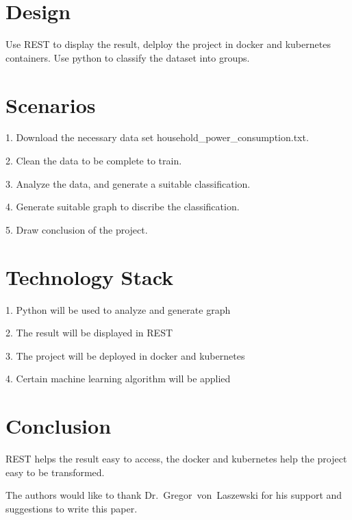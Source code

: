 \section{Design}

Use REST to display the result, delploy the project in docker and kubernetes containers.
Use python to classify the dataset into groups.

\section{Scenarios}

1. Download the necessary data set household\_power\_consumption.txt\cite{editor00}.

2. Clean the data to be complete to train.

3. Analyze the data, and generate a suitable classification.

4. Generate suitable graph to discribe the classification.

5. Draw conclusion of the project.


\section{Technology Stack}

1. Python will be used to analyze and generate graph

2. The result will be displayed in REST

3. The project will be deployed in docker and kubernetes

4. Certain machine learning algorithm will be applied


\section{Conclusion}

REST helps the result easy to access, the docker and kubernetes help the project easy to be transformed.


\begin{acks}

  The authors would like to thank Dr.~Gregor~von~Laszewski for his
  support and suggestions to write this paper.

\end{acks}



 

